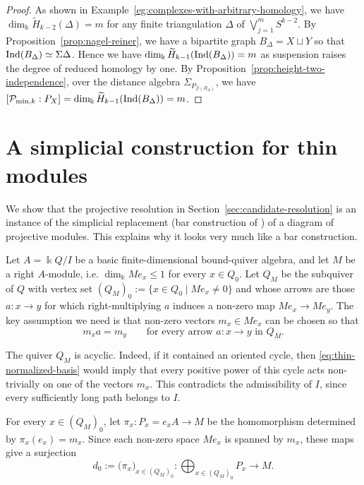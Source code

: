 \documentclass[a4paper,leqno]{amsart}
\begin{document}
\begin{proof}
As shown in Example~\ref{eg:complexes-with-arbitrary-homology}, we have $\dim_{\Bbbk}\widetilde H_{k-2}(\Delta)=m$ for any finite triangulation $\Delta$ of $\bigvee_{j=1}^m S^{k-2}$.  By Proposition~\ref{prop:nagel-reiner}, we have a bipartite graph $B_\Delta=X\sqcup Y$ so that $\operatorname{Ind}(B_\Delta)\simeq \Sigma \Delta$.  
Hence we have $\dim_{\Bbbk}\widetilde H_{k-1}(\operatorname{Ind}(B_\Delta))=m$ as suspension raises the degree of reduced homology by one. 
By Proposition~\ref{prop:height-two-independence}, over the distance algebra $\Sigma_{P_{\mathcal{J}(B_\Delta)}}$, we have $[\mathcal P_{\min,k}:P_X]=\dim_{\Bbbk}\widetilde H_{k-1}(\operatorname{Ind}(B_\Delta))=m$.
\end{proof}

\appendix

\section{A simplicial construction for thin modules}
\label{app:thin-modules}

We show that the projective resolution in Section~\ref{sec:candidate-resolution} is an instance of the simplicial replacement (bar construction of \cite[Definition 4.2.1]{Rie14}) of a diagram of projective modules.
This explains why it looks very much like a bar construction. 

Let $A=\Bbbk Q/I$ be a basic finite-dimensional bound-quiver algebra, and let $M$ be a  right $A$-module, i.e. $\dim_{\Bbbk}Me_x\leq1$ for every $x\in Q_0$.  Let $Q_M$ be the subquiver of $Q$ with vertex set $(Q_M)_0:=\{x\in Q_0\mid Me_x\neq0\}$ and whose arrows are those $a:x\to y$ for which right-multiplying $a$ induces a non-zero map $Me_x\to Me_y$.  The key assumption we need is that non-zero vectors $m_x\in Me_x$ can be chosen so that
\begin{equation}
m_x a=m_y
\qquad
\text{for every arrow $a:x\to y$ in $Q_M$}.
\label{eq:thin-normalized-basis}
\end{equation}

The quiver $Q_M$ is acyclic.  Indeed, if it contained an oriented cycle, then \eqref{eq:thin-normalized-basis} would imply that every positive power of this cycle acts non-trivially on one of the vectors $m_x$.  This contradicts the admissibility of $I$, since every sufficiently long path belongs to $I$.

For every $x\in(Q_M)_0$, let $\pi_x\colon P_x=e_xA\to M$ be the homomorphism determined by $\pi_x(e_x)=m_x$.  Since each non-zero space $Me_x$ is spanned by $m_x$, these maps give a surjection
\begin{equation}\label{eq: pi to M}
d_0:=\bigl(\pi_x\bigr)_{x\in(Q_M)_0}\colon
\bigoplus_{x\in(Q_M)_0}P_x\to M.
\end{equation}
\end{document}

